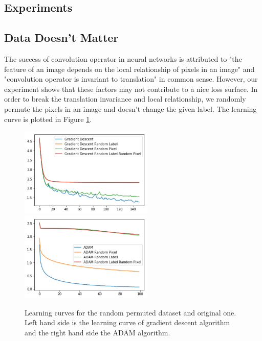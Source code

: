 \documentclass{article}
\theoremstyle{plain}
\theoremstyle{definition}
\begin{document}




\subsection{Experiments}





\subsection{Data Doesn't Matter}

The success of convolution operator in neural networks is attributed to "the feature of an image depends on the local relationship of pixels in an image" and "convolution operator is invariant to translation" in common sense. However, our experiment shows that these factors may not contribute to a nice loss surface. In order to break the translation invariance and local relationship, we randomly permute the pixels in an image and doesn't change the given label. The learning curve is plotted in Figure \ref{randomperb}.

\begin{figure}[htp]
	\centering
	\includegraphics[width=2.5in]{gdrp.jpg}
	\includegraphics[width=2.5in]{adamrp.jpg}
	\caption{Learning curves for the random permuted dataset and original one. Left hand side is the learning curve of gradient descent algorithm and the right hand side the ADAM algorithm.}
	\label{randomperb}
\end{figure}
\end{document}
